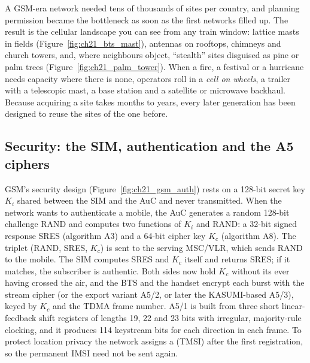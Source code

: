 \begin{inpractice}
A GSM-era network needed tens of thousands of sites per country, and planning permission became the
bottleneck as soon as the first networks filled up. The result is the cellular landscape you can see
from any train window: lattice masts in fields (Figure~\ref{fig:ch21_bts_mast}), antennas on
rooftops, chimneys and church towers, and, where neighbours object, ``stealth'' sites disguised as
pine or palm trees (Figure~\ref{fig:ch21_palm_tower}). When a fire, a festival or a hurricane needs
capacity where there is none, operators roll in a \emph{cell on wheels}, a trailer with a telescopic
mast, a base station and a satellite or microwave backhaul. Because acquiring a site takes months to
years, every later generation has been designed to reuse the sites of the one before.
\end{inpractice}


\subsection{Security: the SIM, authentication and the A5 ciphers}

GSM's security design (Figure~\ref{fig:ch21_gsm_auth}) rests on a 128-bit secret key $K_i$ shared
between the SIM and the AuC and never transmitted. When the network wants to authenticate a mobile,
the AuC generates a random 128-bit challenge RAND and computes two functions of $K_i$ and RAND: a
32-bit signed response SRES (algorithm A3) and a 64-bit cipher key $K_c$ (algorithm A8). The triplet
(RAND, SRES, $K_c$) is sent to the serving MSC/VLR, which sends RAND to the mobile. The SIM computes
SRES and $K_c$ itself and returns SRES; if it matches, the subscriber is authentic. Both sides now
hold $K_c$ without its ever having crossed the air, and the BTS and the handset encrypt each burst
with the stream cipher  (or the export variant A5/2, or later the KASUMI-based A5/3),
keyed by $K_c$ and the TDMA frame number. A5/1 is built from three short linear-feedback shift
registers of lengths 19, 22 and 23 bits with irregular, majority-rule clocking, and it produces 114
keystream bits for each direction in each frame. To protect location privacy the network assigns a
 (TMSI) after the first registration, so the permanent
IMSI need not be sent again.


